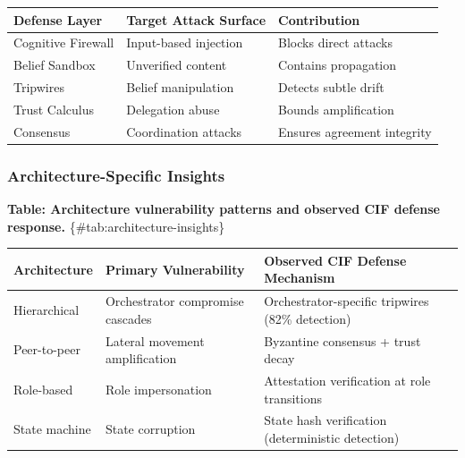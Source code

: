 \documentclass[
]{article}
\newcounter{none} %
\begin{document}
{\def\LTcaptype{none} %
\begin{longtable}[]{@{}lll@{}}
\toprule\noalign{}
Defense Layer & Target Attack Surface & Contribution \\
\midrule\noalign{}
\endhead
\bottomrule\noalign{}
\endlastfoot
Cognitive Firewall & Input-based injection & Blocks direct attacks \\
Belief Sandbox & Unverified content & Contains propagation \\
Tripwires & Belief manipulation & Detects subtle drift \\
Trust Calculus & Delegation abuse & Bounds amplification \\
Consensus & Coordination attacks & Ensures agreement integrity \\
\end{longtable}
}

\subsubsection{Architecture-Specific
Insights}\label{architecture-specific-insights}

\textbf{Table: Architecture vulnerability patterns and observed CIF
defense response.} \{\#tab:architecture-insights\}

{\def\LTcaptype{none} %
\begin{longtable}[]{@{}
  >{\raggedright\arraybackslash}p{}
  >{\raggedright\arraybackslash}p{}
  >{\raggedright\arraybackslash}p{}@{}}
\toprule\noalign{}
\begin{minipage}[b]{\linewidth}\raggedright
Architecture
\end{minipage} & \begin{minipage}[b]{\linewidth}\raggedright
Primary Vulnerability
\end{minipage} & \begin{minipage}[b]{\linewidth}\raggedright
Observed CIF Defense Mechanism
\end{minipage} \\
\midrule\noalign{}
\endhead
\bottomrule\noalign{}
\endlastfoot
Hierarchical & Orchestrator compromise cascades & Orchestrator-specific
tripwires (82\% detection) \\
Peer-to-peer & Lateral movement amplification & Byzantine consensus +
trust decay \\
Role-based & Role impersonation & Attestation verification at role
transitions \\
State machine & State corruption & State hash verification
(deterministic detection) \\
\end{longtable}
}
\end{document}
